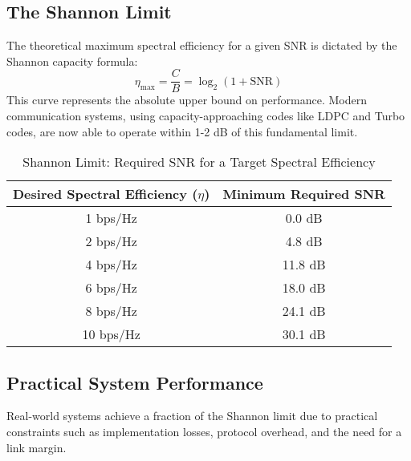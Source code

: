 \subsection{The Shannon Limit}

The theoretical maximum spectral efficiency for a given SNR is dictated by the Shannon capacity formula:
\begin{equation}
    \eta_{\max} = \frac{C}{B} = \log_2(1 + \text{SNR})
\end{equation}
This curve represents the absolute upper bound on performance. Modern communication systems, using capacity-approaching codes like LDPC and Turbo codes, are now able to operate within 1-2 dB of this fundamental limit.

\begin{table}[H]
    \centering
    \caption{Shannon Limit: Required SNR for a Target Spectral Efficiency}
    \label{tab:shannon-efficiency}
    \begin{tabular}{@{}cc@{}}
        \toprule
        \tableheaderfont Desired Spectral Efficiency ($\eta$) & \tableheaderfont Minimum Required SNR \\
        \midrule
        1 bps/Hz & 0.0 dB \\
        2 bps/Hz & 4.8 dB \\
        4 bps/Hz & 11.8 dB \\
        6 bps/Hz & 18.0 dB \\
        8 bps/Hz & 24.1 dB \\
        10 bps/Hz & 30.1 dB \\
        \bottomrule
    \end{tabular}
\end{table}


\subsection{Practical System Performance}

Real-world systems achieve a fraction of the Shannon limit due to practical constraints such as implementation losses, protocol overhead, and the need for a link margin.

